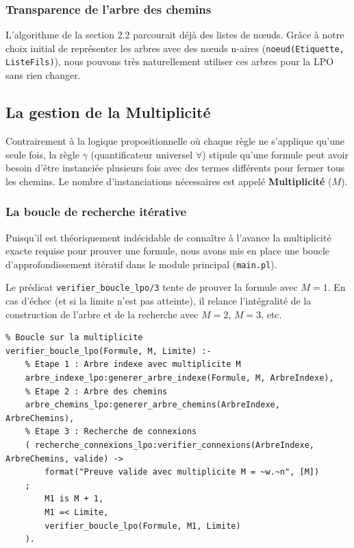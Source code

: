 \documentclass[12pt, a4paper]{article}
\begin{document}
\subsubsection{Transparence de l'arbre des chemins}

L'algorithme de la section 2.2 parcourait déjà des listes de nœuds. Grâce à notre choix initial de représenter les arbres avec des nœuds n-aires (\texttt{noeud(Etiquette, ListeFils)}), nous pouvons très naturellement utiliser ces arbres pour la LPO sans rien changer.

\subsection{La gestion de la Multiplicité}

Contrairement à la logique propositionnelle où chaque règle ne s'applique qu'une seule fois, la règle $\gamma$ (quantificateur universel $\forall$) stipule qu'une formule peut avoir besoin d'être instanciée plusieurs fois avec des termes différents pour fermer tous les chemins. Le nombre d'instanciations nécessaires est appelé \textbf{Multiplicité} ($M$).

\subsubsection{La boucle de recherche itérative}

Puisqu'il est théoriquement indécidable de connaître à l'avance la multiplicité exacte requise pour prouver une formule, nous avons mis en place une boucle d'approfondissement itératif dans le module principal (\texttt{main.pl}).

Le prédicat \texttt{verifier\_boucle\_lpo/3} tente de prouver la formule avec $M=1$. En cas d'échec (et si la limite n'est pas atteinte), il relance l'intégralité de la construction de l'arbre et de la recherche avec $M=2$, $M=3$, etc.

\begin{lstlisting}
% Boucle sur la multiplicite
verifier_boucle_lpo(Formule, M, Limite) :-
    % Etape 1 : Arbre indexe avec multiplicite M
    arbre_indexe_lpo:generer_arbre_indexe(Formule, M, ArbreIndexe),
    % Etape 2 : Arbre des chemins
    arbre_chemins_lpo:generer_arbre_chemins(ArbreIndexe, ArbreChemins),
    % Etape 3 : Recherche de connexions
    ( recherche_connexions_lpo:verifier_connexions(ArbreIndexe, ArbreChemins, valide) ->
        format("Preuve valide avec multiplicite M = ~w.~n", [M])
    ;
        M1 is M + 1,
        M1 =< Limite,
        verifier_boucle_lpo(Formule, M1, Limite)
    ).
\end{lstlisting}
\end{document}
